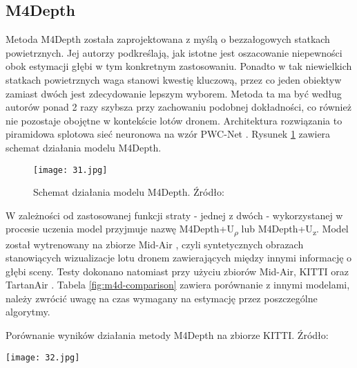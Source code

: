 \subsection{M4Depth}
Metoda M4Depth \cite{fonder2023technique} została zaprojektowana z myślą o bezzałogowych statkach powietrznych. Jej autorzy podkreślają, jak istotne jest oszacowanie niepewności obok estymacji głębi w tym konkretnym zastosowaniu. Ponadto w tak niewielkich statkach powietrznych waga stanowi kwestię kluczową, przez co jeden obiektyw zamiast dwóch jest zdecydowanie lepszym wyborem. Metoda ta ma być według autorów ponad 2 razy szybsza przy zachowaniu podobnej dokładności, co również nie pozostaje obojętne w kontekście lotów dronem. Architektura rozwiązania to piramidowa splotowa sieć neuronowa na wzór PWC-Net \cite{sun2018pwcnet}. Rysunek \ref{fig:m4d-schema} zawiera schemat działania modelu M4Depth.
\begin{figure}[H]
    \centering
    \texttt{[image: 31.jpg]}
    \caption{Schemat działania modelu M4Depth. Źródło: \cite{fonder2023technique}}
    \label{fig:m4d-schema}
\end{figure}
W zależności od zastosowanej funkcji straty - jednej z dwóch - wykorzystanej w procesie uczenia model przyjmuje nazwę M4Depth+U\textsubscript{$\rho$} lub M4Depth+U\textsubscript{z}.
Model został wytrenowany na zbiorze Mid-Air \cite{fonder2019midair}, czyli syntetycznych obrazach stanowiących wizualizacje lotu dronem zawierających między innymi informację o głębi sceny. Testy dokonano natomiast przy użyciu zbiorów Mid-Air, KITTI oraz TartanAir \cite{wang2020tartanair}. Tabela \ref{fig:m4d-comparison} zawiera porównanie z innymi modelami, należy zwrócić uwagę na czas wymagany na estymację przez poszczególne algorytmy.
\begin{table}[H]
    \centering
    \caption{Porównanie wyników działania metody M4Depth na zbiorze KITTI. Źródło: \cite{fonder2023technique}}
    \texttt{[image: 32.jpg]}
    \label{fig:m4d-comparison}
\end{table}

